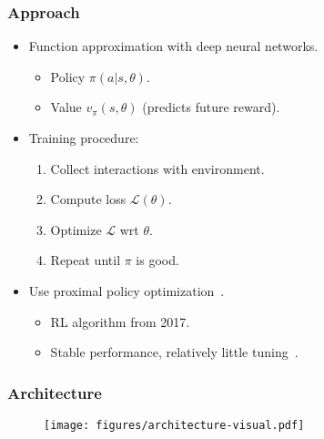 \begin{frame}
    \frametitle{Approach}

    \begin{itemize}
        \item Function approximation with deep neural networks.
        \begin{itemize}
            \item Policy \(\pi(a | s, \theta)\).
            \item Value \(v_\pi(s, \theta)\) (predicts future reward).
        \end{itemize}
        \item Training procedure:
        \begin{enumerate}
            \item Collect interactions with environment.
            \item Compute loss \(\mathcal{L(\theta)}\).
            \item Optimize \(\mathcal{L}\) wrt \(\theta\).
            \item Repeat until \(\pi\) is good.
        \end{enumerate}
        \item Use proximal policy optimization~\cite{schulman_proximal_2017}.
        \begin{itemize}
            \item RL algorithm from 2017.
            \item Stable performance, relatively little tuning~\cite{henderson_deep_2018}.
        \end{itemize}

    \end{itemize}
\end{frame}

\begin{frame}
    \frametitle{Architecture}

    \begin{figure}
        \centering
        \texttt{[image: figures/architecture-visual.pdf]}
    \end{figure}

\end{frame}

